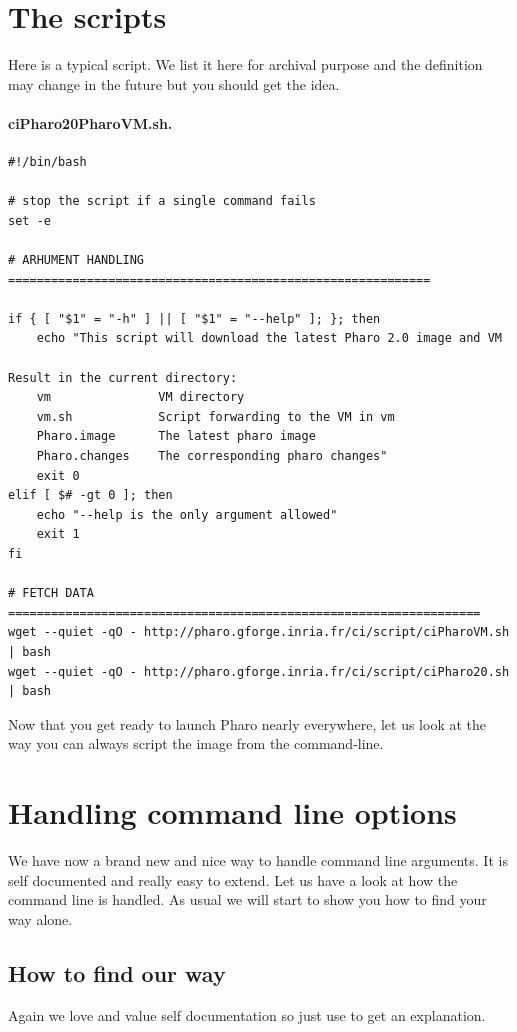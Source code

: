 \documentclass[a4paper,10pt,twoside]{book}
\begin{document}
\section{The scripts}
Here is a typical script. We list it here for archival purpose and the definition may change in the future
but you should get the idea.
	
\paragraph{ciPharo20PharoVM.sh.}

\begin{scriptsize}
\begin{verbatim}
#!/bin/bash

# stop the script if a single command fails
set -e 

# ARHUMENT HANDLING ===========================================================

if { [ "$1" = "-h" ] || [ "$1" = "--help" ]; }; then
    echo "This script will download the latest Pharo 2.0 image and VM

Result in the current directory:
    vm               VM directory
    vm.sh            Script forwarding to the VM in vm
    Pharo.image      The latest pharo image
    Pharo.changes    The corresponding pharo changes"
    exit 0
elif [ $# -gt 0 ]; then
    echo "--help is the only argument allowed"
    exit 1
fi

# FETCH DATA ==================================================================
wget --quiet -qO - http://pharo.gforge.inria.fr/ci/script/ciPharoVM.sh | bash
wget --quiet -qO - http://pharo.gforge.inria.fr/ci/script/ciPharo20.sh | bash
\end{verbatim}
\end{scriptsize}

Now that you get ready to launch Pharo nearly everywhere, let us look at the way you 
can always script the image from the command-line. 


\section{Handling command line options}
We have now a brand new and nice way to handle command line arguments. It is self documented and really easy to extend. Let us have a look at how the command line is handled. As usual we will start to show you how to find your way alone.



\subsection{How to find our way}
Again we love and value self documentation so just use  to get an explanation. 
\end{document}
